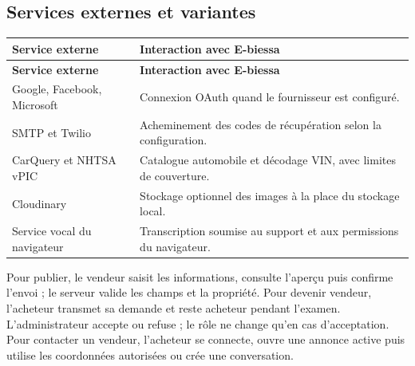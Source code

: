 \subsection{Services externes et variantes}

{\small\singlespacing{}
\begin{longtable}{|>{\raggedright\arraybackslash}p{}|>{\raggedright\arraybackslash}p{}|}
\hline
\rowcolor{tablehead} \color{white}\bfseries Service externe & \color{white}\bfseries Interaction avec E-biessa \\ \hline
\endfirsthead
\rowcolor{tablehead} \color{white}\bfseries Service externe & \color{white}\bfseries Interaction avec E-biessa \\ \hline
\endhead
\hline\endfoot
Google, Facebook, Microsoft & Connexion OAuth quand le fournisseur est configuré. \\ \hline
\rowcolor{tablerow} SMTP et Twilio & Acheminement des codes de récupération selon la configuration. \\ \hline
CarQuery et NHTSA vPIC & Catalogue automobile et décodage VIN, avec limites de couverture. \\ \hline
\rowcolor{tablerow} Cloudinary & Stockage optionnel des images à la place du stockage local. \\ \hline
Service vocal du navigateur & Transcription soumise au support et aux permissions du navigateur. \\ \hline
\end{longtable}
}


Pour publier, le vendeur saisit les informations, consulte l'aperçu puis confirme l'envoi ; le serveur valide les champs et la propriété. Pour devenir vendeur, l'acheteur transmet sa demande et reste acheteur pendant l'examen. L'administrateur accepte ou refuse ; le rôle ne change qu'en cas d'acceptation. Pour contacter un vendeur, l'acheteur se connecte, ouvre une annonce active puis utilise les coordonnées autorisées ou crée une conversation.
